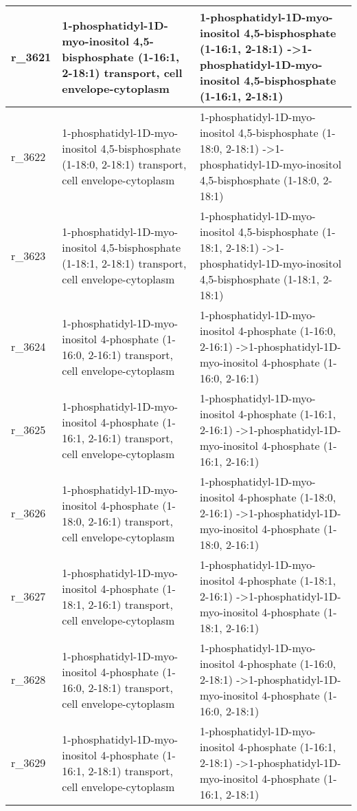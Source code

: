 \begin{landscape}
{\begin{longtable}{|l|p{7cm}|p{15cm}|}
r\_3621 & 1-phosphatidyl-1D-myo-inositol 4,5-bisphosphate (1-16:1, 2-18:1) transport, cell envelope-cytoplasm & 1-phosphatidyl-1D-myo-inositol 4,5-bisphosphate (1-16:1, 2-18:1)  -\textgreater 1-phosphatidyl-1D-myo-inositol 4,5-bisphosphate (1-16:1, 2-18:1) \\ \hline
r\_3622 & 1-phosphatidyl-1D-myo-inositol 4,5-bisphosphate (1-18:0, 2-18:1) transport, cell envelope-cytoplasm & 1-phosphatidyl-1D-myo-inositol 4,5-bisphosphate (1-18:0, 2-18:1)  -\textgreater 1-phosphatidyl-1D-myo-inositol 4,5-bisphosphate (1-18:0, 2-18:1) \\ \hline
r\_3623 & 1-phosphatidyl-1D-myo-inositol 4,5-bisphosphate (1-18:1, 2-18:1) transport, cell envelope-cytoplasm & 1-phosphatidyl-1D-myo-inositol 4,5-bisphosphate (1-18:1, 2-18:1)  -\textgreater 1-phosphatidyl-1D-myo-inositol 4,5-bisphosphate (1-18:1, 2-18:1) \\ \hline
r\_3624 & 1-phosphatidyl-1D-myo-inositol 4-phosphate (1-16:0, 2-16:1) transport, cell envelope-cytoplasm & 1-phosphatidyl-1D-myo-inositol 4-phosphate (1-16:0, 2-16:1)  -\textgreater 1-phosphatidyl-1D-myo-inositol 4-phosphate (1-16:0, 2-16:1) \\ \hline
r\_3625 & 1-phosphatidyl-1D-myo-inositol 4-phosphate (1-16:1, 2-16:1) transport, cell envelope-cytoplasm & 1-phosphatidyl-1D-myo-inositol 4-phosphate (1-16:1, 2-16:1)  -\textgreater 1-phosphatidyl-1D-myo-inositol 4-phosphate (1-16:1, 2-16:1) \\ \hline
r\_3626 & 1-phosphatidyl-1D-myo-inositol 4-phosphate (1-18:0, 2-16:1) transport, cell envelope-cytoplasm & 1-phosphatidyl-1D-myo-inositol 4-phosphate (1-18:0, 2-16:1)  -\textgreater 1-phosphatidyl-1D-myo-inositol 4-phosphate (1-18:0, 2-16:1) \\ \hline
r\_3627 & 1-phosphatidyl-1D-myo-inositol 4-phosphate (1-18:1, 2-16:1) transport, cell envelope-cytoplasm & 1-phosphatidyl-1D-myo-inositol 4-phosphate (1-18:1, 2-16:1)  -\textgreater 1-phosphatidyl-1D-myo-inositol 4-phosphate (1-18:1, 2-16:1) \\ \hline
r\_3628 & 1-phosphatidyl-1D-myo-inositol 4-phosphate (1-16:0, 2-18:1) transport, cell envelope-cytoplasm & 1-phosphatidyl-1D-myo-inositol 4-phosphate (1-16:0, 2-18:1)  -\textgreater 1-phosphatidyl-1D-myo-inositol 4-phosphate (1-16:0, 2-18:1) \\ \hline
r\_3629 & 1-phosphatidyl-1D-myo-inositol 4-phosphate (1-16:1, 2-18:1) transport, cell envelope-cytoplasm & 1-phosphatidyl-1D-myo-inositol 4-phosphate (1-16:1, 2-18:1)  -\textgreater 1-phosphatidyl-1D-myo-inositol 4-phosphate (1-16:1, 2-18:1) \\ \hline

\end{longtable}}
\end{landscape}
